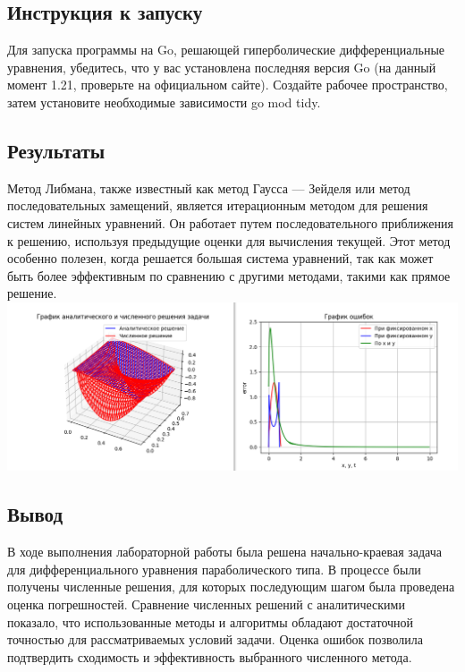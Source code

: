 \documentclass{article}
\begin{document}
\subsection*{Инструкция к запуску}
Для запуска программы на Go, решающей гиперболические дифференциальные уравнения, убедитесь, что у вас установлена последняя версия Go 
(на данный момент 1.21, проверьте на официальном сайте). Создайте рабочее пространство, затем установите необходимые зависимости go mod tidy.

\pagebreak

\subsection*{Результаты}

Метод Либмана, также известный как метод Гаусса — Зейделя или метод последовательных замещений, является итерационным методом для решения систем 
линейных уравнений. Он работает путем последовательного приближения к решению, используя предыдущие оценки для вычисления текущей. Этот метод особенно 
полезен, когда решается большая система уравнений, так как может быть более эффективным по сравнению с другими методами, такими как прямое решение.
\\
\includegraphics[scale=0.4]{errors.png}
\\

\subsection*{Вывод}

В ходе выполнения лабораторной работы была решена начально-краевая задача для дифференциального уравнения параболического типа. В процессе были получены численные решения, 
для которых последующим шагом была проведена оценка погрешностей. Сравнение численных решений с аналитическими показало, что использованные методы и алгоритмы обладают 
достаточной точностью для рассматриваемых условий задачи. Оценка ошибок позволила подтвердить сходимость и эффективность выбранного численного метода.
\end{document}
